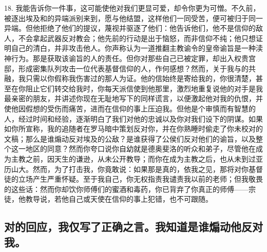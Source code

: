 18. 我能告诉你一件事，这可能使他对我们更显可爱，却令你更为可憎。不久前，被逐出埃及和的异端派别来到，愿与他结盟，这样他们一同受苦，便可被归于同一异端。但他拒绝了他们的提议，蔑视并驱逐了他们：他告诉他们，他不是信仰的敌人，不会拿起武器反对教会；他先前的行动是出于恼怒，而非信仰不纯；他只想证明自己的清白，并非攻击他人。你声称认为一道推翻主教谕令的皇帝谕旨是一种渎神行为。那是获取该谕旨的人的责任。但你对那些自己已被定罪，却出入权贵宫邸，形成密集队列攻击一位代表基督信仰的人，作何感想？然而，关于我与的共融，我只需以你假称我伤害过的那人为证。他的信始终是寄给我的，你很清楚，甚至在你阻止它们转交给我时，你每天派信使到他那里，激烈地重复说他的对手是我最亲密的朋友，并讲述你现在无耻地写下的同样谎言，以便激起他对我的仇恨，并使他因假想的受伤而痛苦，进而在信仰的事上压迫我。但他是个审慎而有智慧的人，经过时间和经验，逐渐明白了我们对他的忠诚以及你对我们设下的阴谋。如果如你所宣称，我的追随者在罗马暗中策划反对你，并在你熟睡时偷走了你未校对的文稿；那么是谁煽动反对埃及的公敌？是谁获得了公侯们反对他们的谕旨，以及整个这一地区的同意？然而你夸口说你自幼就是德奥斐洛的听众和弟子，尽管他在成为主教之前，因天生的谦逊，从未公开教导；而你在成为主教之后，也从未到过亚历山大。然而，为了打击我，你竟敢说：如果那是真的，依我之见，那将对你基督徒的立场产生严重怀疑。至于我自己，你无权指责我谴责我以前的老师；但我敬畏的这些话：然而你却饮你师傅们的蜜酒和毒药，你已背弃了你真正的师傅——宗徒，他教导说，若他自己或天使在信仰的事上犯错，也不可跟随。\par


\subsection{对的回应，我仅写了正确之言。我知道是谁煽动他反对我。}

